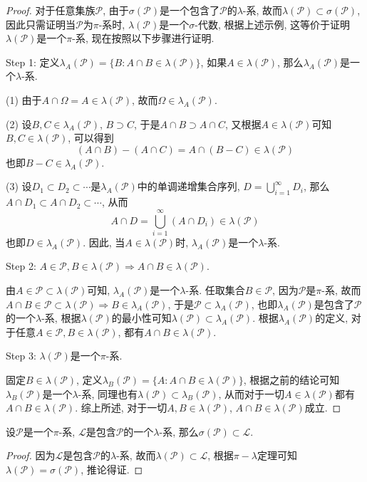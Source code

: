 \documentclass[cn, 12pt, math=mtpro2, bibstyle=apa, blue, twocol]{elegantbook}
\newcommand{\CC}{\mathcal{P}}
\newcommand{\LC}{\lambda(\mathcal{P})}
\begin{document}
\begin{proof}
  对于任意集族$\mathcal{P}$, 由于$\sigma(\mathcal{P})$是一个包含了$\mathcal{P}$的$\lambda$-系, 故而$\lambda(\mathcal{P})\subset\sigma(\mathcal{P})$, 因此只需证明当$\mathcal{P}$为$\pi$-系时, $\lambda(\mathcal{P})$是一个$\sigma$-代数, 根据上述示例, 这等价于证明$\lambda(\mathcal{P})$是一个$\pi$-系, 现在按照以下步骤进行证明.

Step 1: 定义$\lambda_A(\CC)=\{B:A\cap B\in\LC\}$, 如果$A\in\LC$, 那么$\lambda_A(\CC)$是一个$\lambda$-系.

  (1) 由于$A\cap\Omega=A\in\LC$, 故而$\Omega\in\lambda_A(\CC)$.

  (2) 设$B, C\in \lambda_A(\CC)$, $B\supset C$, 于是$A\cap B\supset A\cap C$, 又根据$A\in\LC$可知$B, C\in\LC$, 可以得到
  $$(A\cap B)-(A\cap C)=A\cap(B- C)\in\LC$$
  也即$B- C\in\lambda_A(\CC)$.

  (3) 设$D_1\subset D_2\subset\cdots$是$\lambda_A(\CC)$中的单调递增集合序列, $D=\bigcup_{i=1}^\infty D_i$, 那么$A\cap D_1\subset A\cap D_2\subset\cdots$, 从而
  $$A\cap D=\bigcup_{i=1}^\infty(A\cap D_i)\in\LC$$
  也即$D\in\lambda_A(\CC)$. 因此, 当$A\in\LC$时, $\lambda_A(\CC)$是一个$\lambda$-系.

  Step 2: $A\in \CC, B\in\LC\Rightarrow A\cap B\in\LC$.

  由$A\in\CC\subset\LC$可知, $\lambda_A(\CC)$是一个$\lambda$-系. 任取集合$B\in \CC$, 因为$\CC$是$\pi$-系, 故而$A\cap B\in\CC\subset\LC\Rightarrow B\in\lambda_A(\CC)$, 于是$\CC\subset\lambda_A(\CC)$, 也即$\lambda_A(\CC)$是包含了$\CC$的一个$\lambda$-系, 根据$\LC$的最小性可知$\LC\subset\lambda_A(\CC)$. 根据$\lambda_A(\CC)$的定义, 对于任意$A\in \CC, B\in\LC$, 都有$A\cap B\in\LC$.

  Step 3: $\LC$是一个$\pi$-系.

  固定$B\in\LC$, 定义$\lambda_B(\CC)=\{A: A\cap B\in\LC\}$, 根据之前的结论可知$\lambda_B(\CC)$是一个$\lambda$-系, 同理也有$\LC\subset\lambda_B(\CC)$, 从而对于一切$A\in \LC$都有$A\cap B\in\LC$. 综上所述, 对于一切$A, B\in\LC$, $A\cap B\in\LC$成立.

\end{proof}
\begin{corollary}
设$\CC$是一个$\pi$-系, $\mathcal{L}$是包含$\CC$的一个$\lambda$-系, 那么$\sigma(\CC)\subset \mathcal{L}$.
\end{corollary}
\begin{proof}
  因为$\mathcal{L}$是包含$\CC$的$\lambda$-系, 故而$\lambda(\mathcal{P})\subset \mathcal{L}$, 根据$\pi-\lambda$定理可知$\lambda(\mathcal{P})=\sigma(\mathcal{P})$, 推论得证.
\end{proof}
\end{document}
